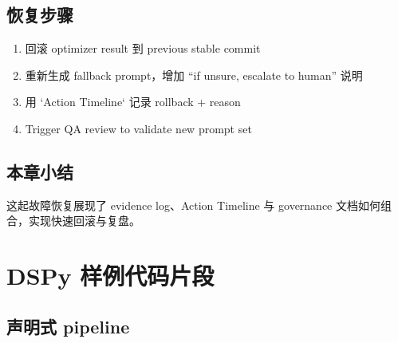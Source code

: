 \documentclass[a4paper]{article}
\begin{document}
\subsection{恢复步骤}

\begin{enumerate}
    \item 回滚 optimizer result 到 previous stable commit
    \item 重新生成 fallback prompt，增加 ``if unsure, escalate to human'' 说明
    \item 用 `Action Timeline` 记录 rollback + reason
    \item Trigger QA review to validate new prompt set
\end{enumerate}

\subsection{本章小结}

这起故障恢复展现了 evidence log、Action Timeline 与 governance 文档如何组合，实现快速回滚与复盘。

\section{DSPy 样例代码片段}

\subsection{声明式 pipeline}
\end{document}
